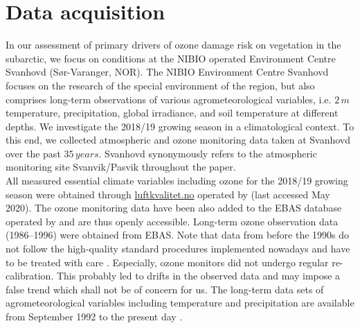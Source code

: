 \documentclass[bg, manuscript]{copernicus}
\begin{document}
\section{Data acquisition}
\label{sec:data}

In our assessment of primary drivers of ozone damage risk on vegetation in the subarctic, we focus on conditions at the NIBIO operated Environment Centre Svanhovd (Sør-Varanger, NOR). The NIBIO Environment Centre Svanhovd focuses on the research of the special environment of the region, but also comprises long-term observations of various agrometeorological variables, i.e. $2\,\unit{m}$ temperature, precipitation, global irradiance, and soil temperature at different depths. We investigate the 2018/19 growing season in a climatological context. To this end, we collected atmospheric and ozone monitoring data taken at Svanhovd over the past $35\,\unit{years}$. Svanhovd synonymously refers to the atmospheric monitoring site Svanvik/Pasvik throughout the paper.\\

All measured essential climate variables including ozone for the 2018/19 growing season were obtained through \href{luftkvalitet.no}{luftkvalitet.no} operated by \citet{NILU_AIRQ} (last accessed May 2020). The ozone monitoring data have been also added to the EBAS database operated by \citet{NILU_EBAS} and are thus openly accessible. Long-term ozone observation data (1986--1996) were obtained from EBAS. Note that data from before the 1990s do not follow the high-quality standard procedures implemented nowadays and have to be treated with care \citep{NILU2003}. Especially, ozone monitors did not undergo regular re-calibration. This probably led to drifts in the observed data and may impose a false trend which shall not be of concern for us.
The long-term data sets of agrometeorological variables including temperature and precipitation are available from September 1992 to the present day \citep[LandbruksMeteorologiske Tjeneste][note the station name here is Pasvik]{LMT_NIBIO}.
\end{document}

